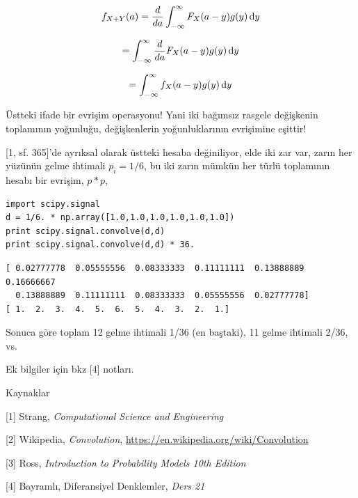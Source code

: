 \documentclass[12pt,fleqn]{article}\usepackage{../../common}
\begin{document}
$$
f_{X+Y}(a) = \frac{d}{da} \int _{-\infty}^{\infty} F_X(a-y) g(y) \,\mathrm{d} y
$$

$$  = \int _{-\infty}^{\infty} \frac{d}{da} F_X(a-y) g(y) \,\mathrm{d} y $$

$$  = \int _{-\infty}^{\infty} f_X(a-y) g(y) \,\mathrm{d} y $$

Üstteki ifade bir evrişim operasyonu! Yani iki bağımsız rasgele değişkenin
toplamının yoğunluğu, değişkenlerin yoğunluklarının evrişimine eşittir!

[1, sf. 365]'de ayrıksal olarak üstteki hesaba değiniliyor, elde iki zar
var, zarın her yüzünün gelme ihtimali $p_i=1/6$, bu iki zarın mümkün her
türlü toplamının hesabı bir evrişim, $p * p$, 

\begin{verbatim}
import scipy.signal
d = 1/6. * np.array([1.0,1.0,1.0,1.0,1.0,1.0])
print scipy.signal.convolve(d,d) 
print scipy.signal.convolve(d,d) * 36.
\end{verbatim}

\begin{verbatim}
[ 0.02777778  0.05555556  0.08333333  0.11111111  0.13888889  0.16666667
  0.13888889  0.11111111  0.08333333  0.05555556  0.02777778]
[ 1.  2.  3.  4.  5.  6.  5.  4.  3.  2.  1.]
\end{verbatim}

Sonuca göre toplam 12 gelme ihtimali 1/36 (en baştaki), 11 gelme ihtimali
2/36, vs.

Ek bilgiler için bkz [4] notları. 

Kaynaklar 

[1] Strang, {\em Computational Science and Engineering}

[2] Wikipedia, {\em Convolution}, \url{https://en.wikipedia.org/wiki/Convolution}

[3] Ross, {\em Introduction to Probability Models 10th Edition}

[4] Bayramlı, Diferansiyel Denklemler, {\em Ders 21}
\end{document}
